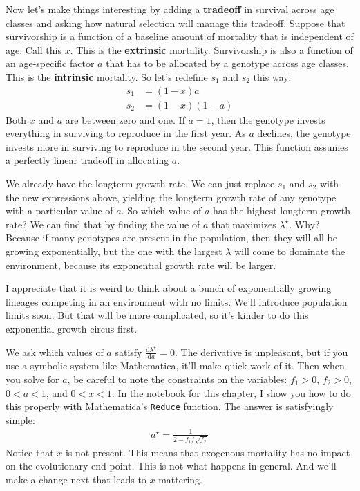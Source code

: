 \documentclass[10pt,reqno]{amsbook}
\newcommand{\bemph}[1]{{\textbf{\textcolor{bemphcol}{#1}}}}
\numberwithin{equation}{chapter}
\newcommand{\mr}{\mathrm}
\newcommand{\ttx}[1]{\texttt{#1}}
\begin{document}
Now let's make things interesting by adding a \bemph{tradeoff} in survival across age classes and asking how natural selection will manage this tradeoff. Suppose that survivorship is a function of a baseline amount of mortality that is independent of age. Call this $x$. This is the \bemph{extrinsic} mortality. Survivorship is also a function of an age-specific factor $a$ that has to be allocated by a genotype across age classes. This is the \bemph{intrinsic} mortality. So let's redefine $s_1$ and $s_2$ this way:
\begin{align*}
	s_1 &= (1-x) a \\
	s_2 &= (1-x) (1-a)
\end{align*}
Both $x$ and $a$ are between zero and one. If $a=1$, then the genotype invests everything in surviving to reproduce in the first year. As $a$ declines, the genotype invests more in surviving to reproduce in the second year. This function assumes a perfectly linear tradeoff in allocating $a$.

We already have the longterm growth rate. We can just replace $s_1$ and $s_2$ with the new expressions above, yielding the longterm growth rate of any genotype with a particular value of $a$. So which value of $a$ has the highest longterm growth rate? We can find that by finding the value of $a$ that maximizes $\lambda^{\!\star}$. Why? Because if many genotypes are present in the population, then they will all be growing exponentially, but the one with the largest $\lambda$ will come to dominate the environment, because its exponential growth rate will be larger. 

I appreciate that it is weird to think about a bunch of exponentially growing lineages competing in an environment with no limits. We'll introduce population limits soon. But that will be more complicated, so it's kinder to do this exponential growth circus first.

We ask which values of $a$ satisfy $\tfrac{\mr d \lambda^{\!\star}}{\mr d a} = 0$. 
The derivative is unpleasant, but if you use a symbolic system like Mathematica, it'll make quick work of it. Then when you solve for $a$, be careful to note the constraints on the variables: $f_1>0$, $f_2>0$, $0<a<1$, and $0<x<1$. In the notebook for this chapter, I show you how to do this properly with Mathematica's \textcolor{bemphcol}{\ttx{Reduce}} function. The answer is satisfyingly simple:
\begin{align*}
	a^{\!\star} = \frac{1}{2 - f_1 / \! \sqrt{f_2}}
\end{align*}
Notice that $x$ is not present. This means that exogenous mortality has no impact on the evolutionary end point. This is not what happens in general. And we'll make a change next that leads to $x$ mattering.
\end{document}
